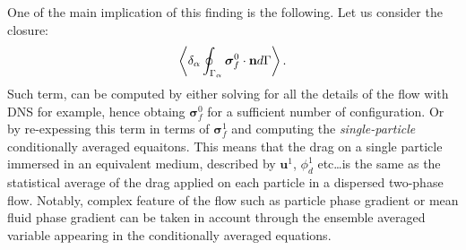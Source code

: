 One of the main implication of this finding is the following.
Let us consider the closure: 
\begin{equation}
    \left<\delta_\alpha \oint_{\Gamma_{\alpha}} \bm\sigma_f^0 \cdot \textbf{n} d\Gamma\right>. 
\end{equation}
Such term, can be computed by either solving for all the details of the flow with DNS for example, hence obtaing $\bm\sigma_f^0$ for a sufficient number of configuration. 
Or by re-expessing this term in terms of $\bm\sigma_f^1$ and computing the \textit{single-particle} conditionally averaged equaitons.
This means that the drag on a single particle immersed in an equivalent medium, described by $\textbf{u}^1$, $\phi_d^1$ etc\ldots is the same as the statistical average of the drag applied on each particle in a dispersed two-phase flow. 
Notably, complex feature of the flow such as particle phase gradient or mean fluid phase gradient can be taken in account through the ensemble averaged variable appearing in the conditionally averaged equations. 

